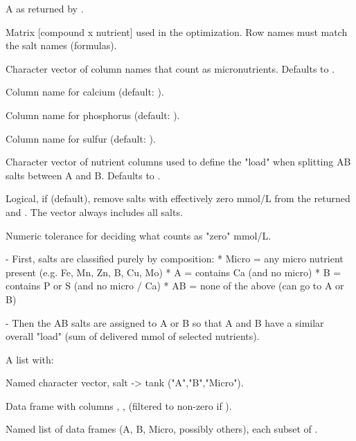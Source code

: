 \documentclass[a4paper]{book}
\begin{document}
%
\begin{Arguments}
\begin{ldescription}
\item[\code{res}] A  as returned by
.

\item[\code{nutrient\_matrix}] Matrix [compound x nutrient] used in the optimization.
Row names must match the salt names (formulas).

\item[\code{micro\_nutrients}] Character vector of column names that count as
micronutrients. Defaults to .

\item[\code{calcium\_nutrient}] Column name for calcium (default: ).

\item[\code{phosphorus\_nutrient}] Column name for phosphorus (default: ).

\item[\code{sulfur\_nutrient}] Column name for sulfur (default: ).

\item[\code{balance\_nutrients}] Character vector of nutrient columns used to define
the "load" when splitting AB salts between A and B. Defaults to
.

\item[\code{drop\_zero}] Logical, if  (default), remove salts with
effectively zero mmol/L from the returned  and .
The  vector always includes all salts.

\item[\code{tol}] Numeric tolerance for deciding what counts as "zero" mmol/L.
\end{ldescription}
\end{Arguments}
%
\begin{Details}
- First, salts are classified purely by composition:
* Micro  = any micro nutrient present (e.g. Fe, Mn, Zn, B, Cu, Mo)
* A      = contains Ca (and no micro)
* B      = contains P or S (and no micro / Ca)
* AB     = none of the above (can go to A or B)

- Then the AB salts are assigned to A or B so that A and B have a similar
overall "load" (sum of delivered mmol of selected nutrients).
\end{Details}
%
\begin{Value}
A list with:
\begin{ldescription}
\item[\code{assignments}] Named character vector, salt -> tank ("A","B","Micro").
\item[\code{table}] Data frame with columns , , 
(filtered to non-zero if ).
\item[\code{by\_tank}] Named list of data frames (A, B, Micro, possibly others),
each subset of .
\end{ldescription}
\end{Value}
\end{document}
